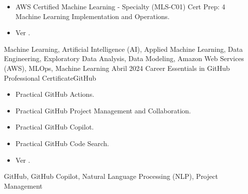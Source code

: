 \begin{certs}
{\begin{itemize}
        \item AWS Certified Machine Learning - Specialty (MLS-C01) Cert Prep: 4 Machine Learning Implementation and Operations.
        \item Ver \href{https://www.linkedin.com/learning/certificates/5f7c2d8f4d0b5e254b7d03b4cc8ceab694ef17b4c567831e44cfdc0de9aaa378}{\color{CadetBlue}{Certificado}}.
      \end{itemize}
    }
    {Machine Learning, Artificial Intelligence (AI), Applied Machine Learning, Data Engineering, Exploratory Data Analysis, Data Modeling, Amazon Web Services (AWS), MLOps, Machine Learning}
    \emptySeparator
    \cert
    {Abril 2024} {Career Essentials in GitHub Professional Certificate}{GitHub}{}
    {}    {
      \begin{itemize}
        \item Practical GitHub Actions.
        \item Practical GitHub Project Management and Collaboration.
        \item Practical GitHub Copilot.
        \item Practical GitHub Code Search.
        \item Ver \href{https://www.linkedin.com/learning/certificates/c23b9c9dfaf002a5e1037568e5fa40d1facc167610ee06e1863539ed0ea498c1}{\color{CadetBlue}{Certificado}}.
      \end{itemize}
    }
    {GitHub, GitHub Copilot, Natural Language Processing (NLP), Project Management}     
\end{certs}